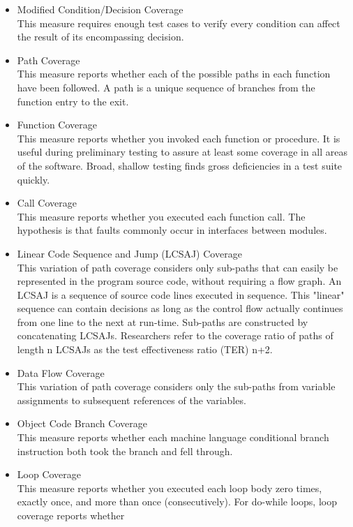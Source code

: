 \begin{itemize}
   \item Modified Condition/Decision Coverage \\
      This measure requires enough test cases to verify every condition can affect the
      result of its encompassing decision. 
   \item Path Coverage \\
      This measure reports whether each of the possible paths in each function have been 
      followed. A path is a unique sequence of branches from the function entry to the
      exit.
   \item Function Coverage \\
      This measure reports whether you invoked each function or procedure. It is useful
      during preliminary testing to assure at least some coverage in all areas of the
      software. Broad, shallow testing finds gross deficiencies in a test suite quickly.
   \item Call Coverage \\
      This measure reports whether you executed each function call. The hypothesis is that
      faults commonly occur in interfaces between modules.
   \item Linear Code Sequence and Jump (LCSAJ) Coverage \\
      This variation of path coverage considers only sub-paths that can easily be
      represented in the program source code, without requiring a flow graph.
      An LCSAJ is a sequence of source code lines executed in sequence. This
      "linear" sequence can contain decisions as long as the control flow actually continues
      from one line to the next at run-time. Sub-paths are constructed by concatenating
      LCSAJs. Researchers refer to the coverage ratio of paths of length n LCSAJs as the
      test effectiveness ratio (TER) n+2.
   \item Data Flow Coverage \\
      This variation of path coverage considers only the sub-paths from variable
      assignments to subsequent references of the variables.
   \item Object Code Branch Coverage \\
      This measure reports whether each machine language conditional branch instruction
      both took the branch and fell through.
   \item Loop Coverage \\
      This measure reports whether you executed each loop body zero times, exactly once,
      and more than once (consecutively). For do-while loops, loop coverage reports whether

\end{itemize}
